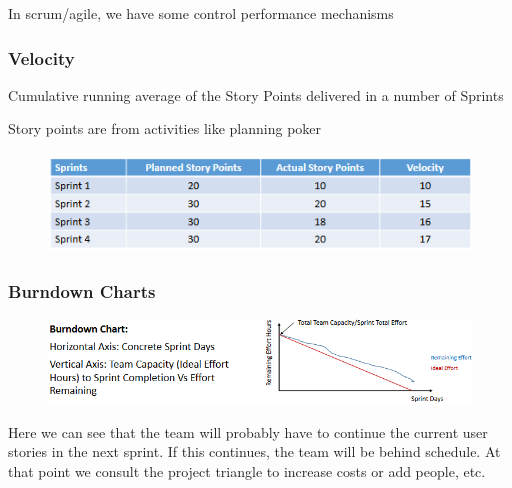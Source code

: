 \documentclass[]{project_plan}
\begin{document}
In scrum/agile, we have some control performance mechanisms

\subsubsection{Velocity}
Cumulative running average of the Story Points delivered in a number of Sprints

Story points are from activities like planning poker

\begin{figure}[H]
  \centering
  \includegraphics[width=\linewidth]{velocity.png}
\end{figure}

\subsubsection{Burndown Charts}

\begin{figure}[H]
  \centering
  \includegraphics[width=\linewidth]{burdown chart.png}
\end{figure}

Here we can see that the team will probably have to continue the current user
stories in the next sprint. If this continues, the team will be behind schedule.
At that point we consult the project triangle to increase costs or add people, etc.
\end{document}
